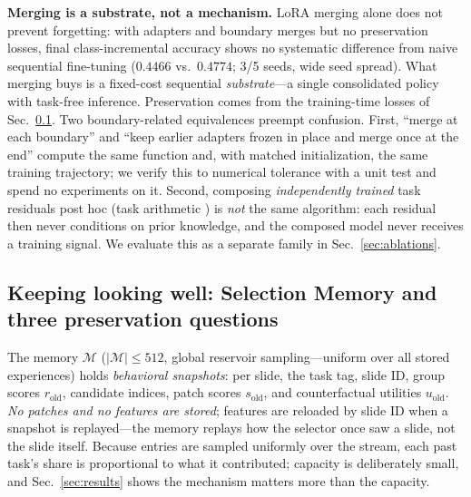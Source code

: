 \documentclass{article}
\begin{document}
\textbf{Merging is a substrate, not a mechanism.} LoRA merging alone does not prevent forgetting: with adapters and boundary merges but no preservation losses, final class-incremental accuracy shows no systematic difference from naive sequential fine-tuning ($0.4466$ vs.\ $0.4774$; 3/5 seeds, wide seed spread). What merging buys is a fixed-cost sequential \emph{substrate}---a single consolidated policy with task-free inference. Preservation comes from the training-time losses of Sec.~\ref{ssec:mem}. Two boundary-related equivalences preempt confusion. First, ``merge at each boundary'' and ``keep earlier adapters frozen in place and merge once at the end'' compute the same function and, with matched initialization, the same training trajectory; we verify this to numerical tolerance with a unit test and spend no experiments on it. Second, composing \emph{independently trained} task residuals post hoc (task arithmetic \cite{ilharco2023task}) is \emph{not} the same algorithm: each residual then never conditions on prior knowledge, and the composed model never receives a training signal. We evaluate this as a separate family in Sec.~\ref{sec:ablations}.

\subsection{Keeping looking well: Selection Memory and three preservation questions}
\label{ssec:mem}
The memory $\mathcal{M}$ ($|\mathcal{M}|\le 512$, global reservoir sampling---uniform over all stored experiences) holds \emph{behavioral snapshots}: per slide, the task tag, slide ID, group scores $r_{\mathrm{old}}$, candidate indices, patch scores $s_{\mathrm{old}}$, and counterfactual utilities $u_{\mathrm{old}}$. \emph{No patches and no features are stored}; features are reloaded by slide ID when a snapshot is replayed---the memory replays how the selector once saw a slide, not the slide itself. Because entries are sampled uniformly over the stream, each past task's share is proportional to what it contributed; capacity is deliberately small, and Sec.~\ref{sec:results} shows the mechanism matters more than the capacity.
\end{document}
